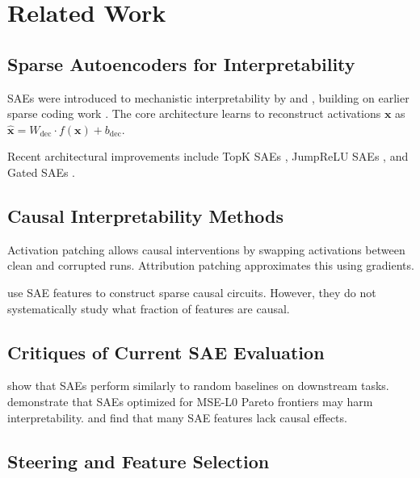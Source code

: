 \documentclass{article}
\begin{document}
\section{Related Work}
\label{sec:related_work}

\subsection{Sparse Autoencoders for Interpretability}

SAEs were introduced to mechanistic interpretability by \citet{bricken2023towards} and \citet{cunningham2023sparse}, building on earlier sparse coding work \citep{olshausen1997sparse}. The core architecture learns to reconstruct activations $\mathbf{x}$ as $\hat{\mathbf{x}} = W_{\text{dec}} \cdot f(\mathbf{x}) + b_{\text{dec}}$.

Recent architectural improvements include TopK SAEs \citep{gao2024scaling}, JumpReLU SAEs \citep{rajamanoharan2024improving}, and Gated SAEs \citep{rajamanoharan2024gated}.

\subsection{Causal Interpretability Methods}

Activation patching \citep{vig2020investigating, meng2022locating} allows causal interventions by swapping activations between clean and corrupted runs. Attribution patching \citep{syed2024attribution} approximates this using gradients.

\citet{marks2024sparse} use SAE features to construct sparse causal circuits. However, they do not systematically study what fraction of features are causal.

\subsection{Critiques of Current SAE Evaluation}

\citet{he2025sanity} show that SAEs perform similarly to random baselines on downstream tasks. \citet{minegishi2025rethinking} demonstrate that SAEs optimized for MSE-L0 Pareto frontiers may harm interpretability. \citet{chaudhary2024evidence} and \citet{karvonen2025saebench} find that many SAE features lack causal effects.

\subsection{Steering and Feature Selection}
\end{document}
